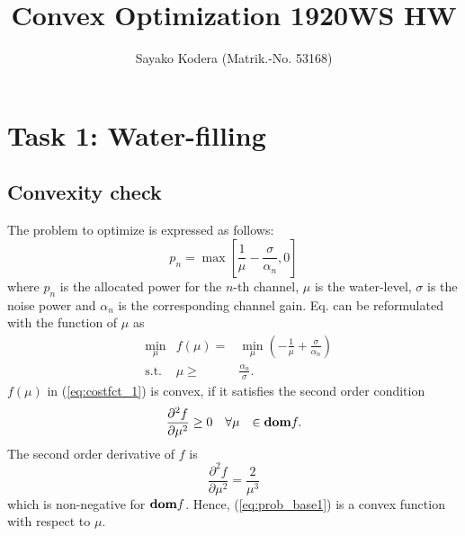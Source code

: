 \documentclass[10pt,a4paper]{article}
\begin{document}
\title{Convex Optimization 1920WS HW}
\author{Sayako Kodera (Matrik.-No. 53168)\\} 
\date{}

\maketitle


\section{Task 1: Water-filling} 
\subsection{Convexity check}
The problem to optimize is expressed as follows: 
\begin{equation} \label{eq:prob_base1}
p_n = \max \left[ \frac{1}{\mu} - \frac{\sigma}{\alpha_{n}}, 0 \right]
\end{equation}
where $p_n$ is the allocated power for the $n$-th channel, $\mu$ is the water-level, $\sigma$ is the noise power and $\alpha_n$ is the corresponding channel gain. Eq. \label{prob_base} can be reformulated with the function of $\mu$ as
\begin{equation} \label{eq:costfct_1}
\begin{aligned}
 & \min_{\mu} & f (\mu) = & \min_{\mu} \left( - \frac{1}{\mu} + \frac{\sigma}{\alpha_{n}} \right) \\
 & \text{s.t.}  & \mu \geq  & \frac{\alpha_{n}}{\sigma}.
\end{aligned}
\end{equation}
$f (\mu)$ in (\ref{eq:costfct_1}) is convex, if it satisfies the second order condition 
\begin{equation}
\begin{aligned}
 & \frac{\partial^{2} f}{\partial \mu^{2}} \geq 0 & \forall & \mu & \in \text{\bf dom} f .\\
\end{aligned}
\end{equation}
The second order derivative of $f$ is 
\begin{equation}
\frac{\partial^{2} f}{\partial \mu^{2}}  = \frac{2}{\mu^{3}}
\end{equation}
which is non-negative for $\text{\bf dom} f$. Hence, (\ref{eq:prob_base1}) is a convex function with respect to $\mu$.
\end{document}
